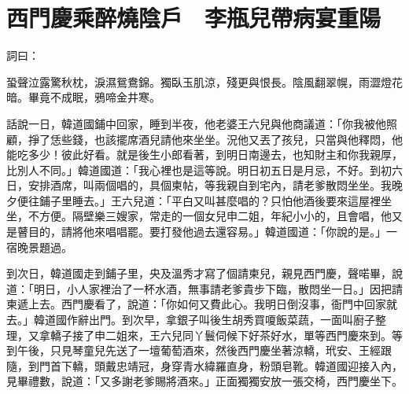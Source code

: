 %

\chapter{西門慶乘醉燒陰戶　李瓶兒帶病宴重陽}

詞曰：

蛩聲泣露驚秋枕，淚濕鴛鴦錦。獨臥玉肌涼，殘更與恨長。陰風翻翠幌，雨澀燈花暗。畢竟不成眠，鴉啼金井寒。

話說一日，韓道國鋪中回家，睡到半夜，他老婆王六兒與他商議道：「你我被他照顧，掙了恁些錢，也該擺席酒兒請他來坐坐。況他又丟了孩兒，只當與他釋悶，他能吃多少！彼此好看。就是後生小郎看著，到明日南邊去，也知財主和你我親厚，比別人不同。」韓道國道：「我心裡也是這等說。明日初五日是月忌，不好。到初六日，安排酒席，叫兩個唱的，具個柬帖，等我親自到宅內，請老爹散悶坐坐。我晚夕便往鋪子里睡去。」王六兒道：「平白又叫甚麼唱的？只怕他酒後要來這屋裡坐坐，不方便。隔壁樂三嫂家，常走的一個女兒申二姐，年紀小小的，且會唱，他又是瞽目的，請將他來唱唱罷。要打發他過去還容易。」韓道國道：「你說的是。」一宿晚景題過。

到次日，韓道國走到鋪子里，央及溫秀才寫了個請柬兒，親見西門慶，聲喏畢，說道：「明日，小人家裡治了一杯水酒，無事請老爹貴步下臨，散悶坐一日。」因把請柬遞上去。西門慶看了，說道：「你如何又費此心。我明日倒沒事，衙門中回家就去。」韓道國作辭出門。到次早，拿銀子叫後生胡秀買嗄飯菜蔬，一面叫廚子整理，又拿轎子接了申二姐來，王六兒同丫鬟伺候下好茶好水，單等西門慶來到。等到午後，只見琴童兒先送了一壇葡萄酒來，然後西門慶坐著涼轎，玳安、王經跟隨，到門首下轎，頭戴忠靖冠，身穿青水緯羅直身，粉頭皂靴。韓道國迎接入內，見畢禮數，說道：「又多謝老爹賜將酒來。」正面獨獨安放一張交椅，西門慶坐下。

